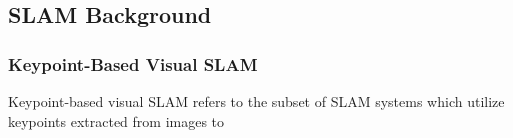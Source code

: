 \subsection{SLAM Background}

\subsubsection{Keypoint-Based Visual SLAM}

Keypoint-based visual SLAM refers to the subset of SLAM systems which utilize keypoints extracted from images to



